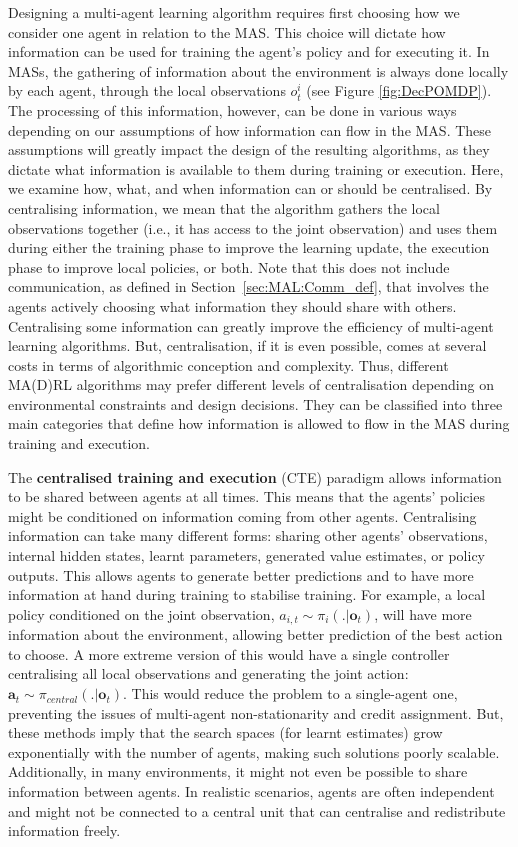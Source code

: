 Designing a multi-agent learning algorithm requires first choosing how we consider one agent in relation to the MAS. This choice will dictate how information can be used for training the agent's policy and for executing it. In MASs, the gathering of information about the environment is always done locally by each agent, through the local observations $o_t^i$ (see Figure \ref{fig:DecPOMDP}). The processing of this information, however, can be done in various ways depending on our assumptions of how information can flow in the MAS. These assumptions will greatly impact the design of the resulting algorithms, as they dictate what information is available to them during training or execution. Here, we examine how, what, and when information can or should be centralised. By centralising information, we mean that the algorithm gathers the local observations together (i.e., it has access to the joint observation) and uses them during either the training phase to improve the learning update, the execution phase to improve local policies, or both. Note that this does not include communication, as defined in Section~\ref{sec:MAL:Comm_def}, that involves the agents actively choosing what information they should share with others. Centralising some information can greatly improve the efficiency of multi-agent learning algorithms. But, centralisation, if it is even possible, comes at several costs in terms of algorithmic conception and complexity. Thus, different MA(D)RL algorithms may prefer different levels of centralisation depending on environmental constraints and design decisions. They can be classified into three main categories that define how information is allowed to flow in the MAS during training and execution.

The \textbf{centralised training and execution} (CTE) paradigm allows information to be shared between agents at all times. This means that the agents' policies might be conditioned on information coming from other agents. 
Centralising information can take many different forms: sharing other agents' observations, internal hidden states, learnt parameters, generated value estimates, or policy outputs. This allows agents to generate better predictions and to have more information at hand during training to stabilise training. For example, a local policy conditioned on the joint observation, $a_{i,t}\sim\pi_i(.|\mathbf{o}_t)$, will have more information about the environment, allowing better prediction of the best action to choose. A more extreme version of this would have a single controller centralising all local observations and generating the joint action: $\mathbf{a}_t\sim\pi_{central}(.|\mathbf{o}_t)$. This would reduce the problem to a single-agent one, preventing the issues of multi-agent non-stationarity and credit assignment. 
But, these methods imply that the search spaces (for learnt estimates) grow exponentially with the number of agents, making such solutions poorly scalable. 
Additionally, in many environments, it might not even be possible to share information between agents. In realistic scenarios, agents are often independent and might not be connected to a central unit that can centralise and redistribute information freely.

